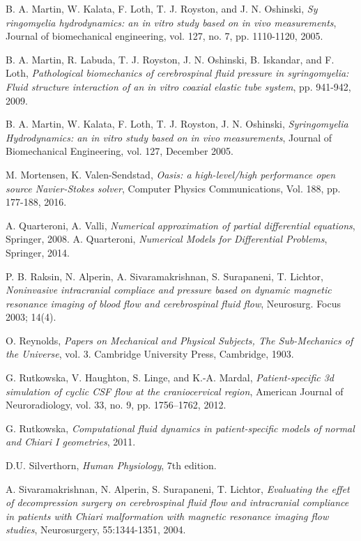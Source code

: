 \documentclass[a4paper,11pt,openright,twoside]{book}
\begin{document}
\begin{thebibliography}{100}
 B. A. Martin, W. Kalata, F. Loth, T. J. Royston, and J. N. Oshinski, \emph{Sy ringomyelia hydrodynamics: an in vitro study based on in vivo measurements}, Journal of biomechanical engineering, vol. 127, no. 7, pp. 1110-1120, 2005.

 B. A. Martin, R. Labuda, T. J. Royston, J. N. Oshinski, B. Iskandar, and F. Loth, \emph{Pathological biomechanics of cerebrospinal fluid pressure in syringomyelia: Fluid structure interaction of an in vitro coaxial elastic tube system}, pp. 941-942, 2009.

 B. A. Martin, W. Kalata, F. Loth, T. J. Royston, J. N. Oshinski, \emph{Syringomyelia Hydrodynamics: an in vitro study based on in vivo measurements}, Journal of Biomechanical Engineering, vol. 127, December 2005.


 M. Mortensen, K. Valen-Sendstad, \emph{Oasis: a high-level/high performance open source Navier-Stokes solver}, Computer Physics Communications, Vol. 188, pp. 177-188, 2016.

 A. Quarteroni, A. Valli, \emph{Numerical approximation of partial differential equations}, Springer, 2008.
 A. Quarteroni, \emph{Numerical Models for Differential Problems}, Springer, 2014.

 P. B. Raksin, N. Alperin, A. Sivaramakrishnan, S. Surapaneni, T. Lichtor, \emph{Noninvasive intracranial compliace and pressure based on dynamic magnetic resonance imaging of blood flow and cerebrospinal fluid flow}, Neurosurg. Focus 2003; 14(4).

 O. Reynolds, \emph{Papers on Mechanical and Physical Subjects, The Sub-Mechanics of the Universe}, vol. 3. Cambridge University Press, Cambridge, 1903.

  G. Rutkowska, V. Haughton, S. Linge, and K.-A. Mardal, \emph{Patient-specific 3d simulation of cyclic CSF flow at the craniocervical region}, American Journal of Neuroradiology, vol. 33, no. 9, pp. 1756–1762, 2012.

 G. Rutkowska, \emph{Computational fluid dynamics in patient-specific models of normal and Chiari I geometries}, 2011.

 D.U. Silverthorn, \emph{Human Physiology}, 7th edition.

 A. Sivaramakrishnan, N. Alperin, S. Surapaneni, T. Lichtor, \emph{Evaluating the effet of decompression surgery on cerebrospinal fluid flow and intracranial compliance in patients with Chiari malformation with magnetic resonance imaging flow studies}, Neurosurgery, 55:1344-1351, 2004.


\end{thebibliography}
\end{document}
